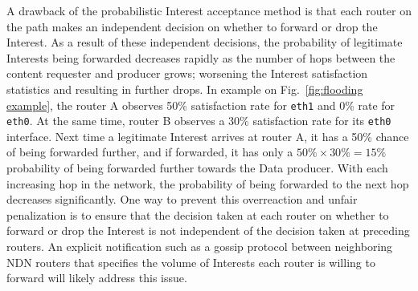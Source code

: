 A drawback of the probabilistic Interest acceptance method is that each router on the path makes an independent decision on whether to forward or drop the Interest. 
As a result of these independent decisions,  the probability of legitimate Interests being forwarded decreases rapidly as the number of hops between the content requester and producer grows; worsening the Interest satisfaction statistics and resulting in further drops.
In example on Fig.~\ref{fig:flooding example}, the router A observes 50\% satisfaction rate for \texttt{eth1} and 0\% rate for \texttt{eth0}. 
At the same time, router B observes a 30\% satisfaction rate for its \texttt{eth0} interface.
Next time a legitimate Interest arrives at router A, it has a 50\% chance of being forwarded further, and if forwarded, it has only a $50\% \times 30\% = 15\%$ probability of being forwarded further towards the Data producer. With each increasing hop in the network, the probability of being forwarded to the next hop decreases significantly. 
One way to prevent this overreaction and unfair penalization is to ensure that the decision taken at each router on whether to forward or drop the Interest is not independent of the decision taken at preceding routers. An explicit notification such as a gossip protocol between neighboring NDN routers that specifies the volume of Interests each router is willing to forward will likely address this issue.


